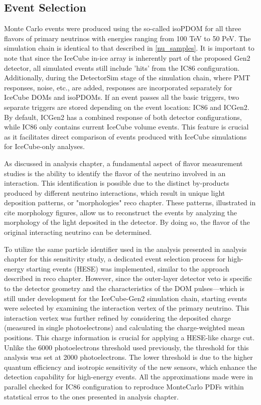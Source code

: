 \subsection{Event Selection}
\label{sec:gen2_eventsample}

Monte Carlo events were produced using the so-called isoPDOM for all three flavors of primary neutrinos with energies ranging from 100 TeV to 50 PeV. The simulation chain is identical to that described in \ref{nu_samples}. It is important to note that since the IceCube in-ice array is inherently part of the proposed Gen2 detector, all simulated events still include 'hits' from the IC86 configuration. Additionally, during the DetectorSim stage of the simulation chain, where PMT responses, noise, etc., are added, responses are incorporated separately for IceCube DOMs and isoPDOMs. If an event passes all the basic triggers, two separate triggers are stored depending on the event location: IC86 and ICGen2. By default, ICGen2 has a combined response of both detector configurations, while IC86 only contains current IceCube volume events. This feature is crucial as it facilitates direct comparison of events produced with IceCube simulations for IceCube-only analyses.

As discussed in analysis chapter, a fundamental aspect of flavor measurement studies is the ability to identify the flavor of the neutrino involved in an interaction. This identification is possible due to the distinct by-products produced by different neutrino interactions, which result in unique light deposition patterns, or "morphologies" reco chapter. These patterns, illustrated in cite morphology figures, allow us to reconstruct the events by analyzing the morphology of the light deposited in the detector. By doing so, the flavor of the original interacting neutrino can be determined.

To utilize the same particle identifier used in the analysis presented in analysis chapter for this sensitivity study, a dedicated event selection process for high-energy starting events (HESE) was implemented, similar to the approach described in reco chapter. However, since the outer-layer detector veto is specific to the detector geometry and the characteristics of the DOM pulses—which is still under development for the IceCube-Gen2 simulation chain, starting events were selected by examining the interaction vertex of the primary neutrino. This interaction vertex was further refined by considering the deposited charge (measured in single photoelectrons) and calculating the charge-weighted mean positions. This charge information is crucial for applying a HESE-like charge cut. Unlike the 6000 photoelectrons threshold used previously, the threshold for this analysis was set at 2000 photoelectrons. The lower threshold is due to the higher quantum efficiency and isotropic sensitivity of the new sensors, which enhance the detection capability for high-energy events. All the approximations made were in parallel checked for IC86 configuration to reproduce MonteCarlo PDFs within statstical erros to the ones presented in analysis chapter.


